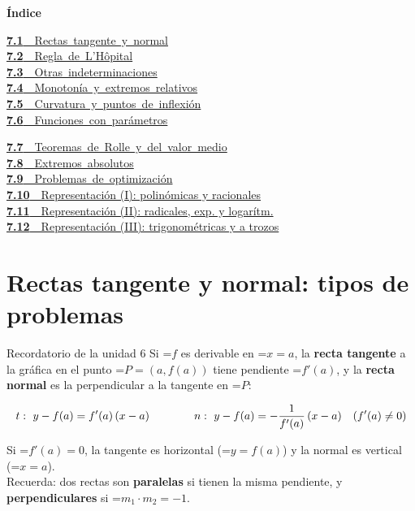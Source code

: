 \documentclass[11pt,a4paper]{article}
\newcommand{\fmm}[1]{\setbox0=\hbox{$#1$}\ifdim\wd0>\linewidth\fmdisp{#1}\else\mbox{\box0}\fi}
\newcommand{\fmdisp}[1]{\[\setbox2=\hbox{$\displaystyle #1$}\ifdim\wd2>\linewidth\resizebox{\linewidth}{!}{\box2}\else\box2\fi\]}
\begin{document}
\begin{tcolorbox}[colback=fmsurface,colframe=fmsurface,arc=3mm,left=4mm,right=4mm,top=2mm,bottom=2mm]
\small\textbf{Índice}\par\smallskip
\begin{minipage}[t]{0.49\linewidth}\small \mbox{\hyperlink{sec1}{\textbf{\color{fmgreen}7.1}\ \ Rectas tangente y normal}}\\[3pt]
\mbox{\hyperlink{sec2}{\textbf{\color{fmgreen}7.2}\ \ Regla de L'Hôpital}}\\[3pt]
\mbox{\hyperlink{sec3}{\textbf{\color{fmgreen}7.3}\ \ Otras indeterminaciones}}\\[3pt]
\mbox{\hyperlink{sec4}{\textbf{\color{fmgreen}7.4}\ \ Monotonía y extremos relativos}}\\[3pt]
\mbox{\hyperlink{sec5}{\textbf{\color{fmgreen}7.5}\ \ Curvatura y puntos de inflexión}}\\[3pt]
\mbox{\hyperlink{sec6}{\textbf{\color{fmgreen}7.6}\ \ Funciones con parámetros}}\\[3pt]\end{minipage}\hfill\begin{minipage}[t]{0.49\linewidth}\small \mbox{\hyperlink{sec7}{\textbf{\color{fmgreen}7.7}\ \ Teoremas de Rolle y del valor medio}}\\[3pt]
\mbox{\hyperlink{sec8}{\textbf{\color{fmgreen}7.8}\ \ Extremos absolutos}}\\[3pt]
\mbox{\hyperlink{sec9}{\textbf{\color{fmgreen}7.9}\ \ Problemas de optimización}}\\[3pt]
\hyperlink{sec10}{\textbf{\color{fmgreen}7.10}\ \ Representación (I): polinómicas y racionales}\\[3pt]
\hyperlink{sec11}{\textbf{\color{fmgreen}7.11}\ \ Representación (II): radicales, exp. y logarítm.}\\[3pt]
\hyperlink{sec12}{\textbf{\color{fmgreen}7.12}\ \ Representación (III): trigonométricas y a trozos}\\[3pt]\end{minipage}
\end{tcolorbox}

\section{Rectas tangente y normal: tipos de problemas}\hypertarget{sec1}{}

\begin{fmprop}{Recordatorio de la unidad 6}
Si \fmm{f} es derivable en \fmm{x=a}, la \textbf{recta tangente} a la gráfica en el punto \fmm{P=(a,f(a))} tiene pendiente \fmm{f'(a)}, y la \textbf{recta normal} es la perpendicular a la tangente en \fmm{P}:

\fmdisp{t:\ y-f(a)=f'(a)\,(x-a)\qquad\qquad n:\ y-f(a)=-\frac{1}{f'(a)}\,(x-a)\quad(f'(a)\neq0)}

Si \fmm{f'(a)=0}, la tangente es horizontal (\fmm{y=f(a)}) y la normal es vertical (\fmm{x=a}). \\[2ex]
Recuerda: dos rectas son \textbf{paralelas} si tienen la misma pendiente, y \textbf{perpendiculares} si \fmm{m_1\cdot m_2=-1}.
\end{fmprop}
\end{document}
